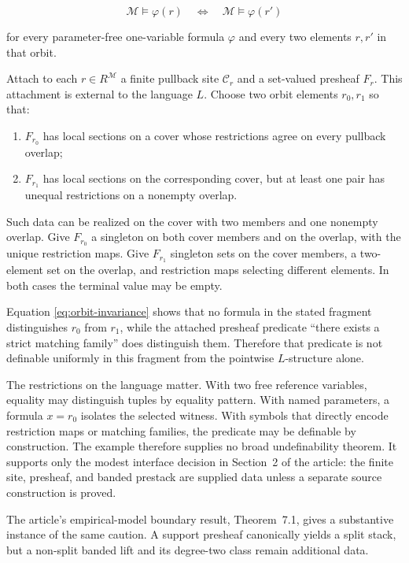 \begin{equation}\label{eq:orbit-invariance}
 \mathcal M\models\varphi(r)
 \quad\Longleftrightarrow\quad
 \mathcal M\models\varphi(r')
\end{equation}

for every parameter-free one-variable formula \(\varphi\) and every two
elements \(r,r'\) in that orbit.

Attach to each \(r\in R^\mathcal M\) a finite pullback site
\(\mathcal C_r\) and a set-valued presheaf \(F_r\).  This attachment is
external to the language \(L\).  Choose two orbit elements \(r_0,r_1\) so
that:

\begin{enumerate}[label=(\roman*),nosep]
\item \(F_{r_0}\) has local sections on a cover whose restrictions agree on
      every pullback overlap;
\item \(F_{r_1}\) has local sections on the corresponding cover, but at least
      one pair has unequal restrictions on a nonempty overlap.
\end{enumerate}

Such data can be realized on the cover with two members and one nonempty
overlap.  Give \(F_{r_0}\) a singleton on both cover members and on the
overlap, with the unique restriction maps.  Give \(F_{r_1}\) singleton
sets on the cover members, a two-element set on the overlap, and restriction
maps selecting different elements.  In both cases the terminal value may be
empty.

Equation \eqref{eq:orbit-invariance} shows that no formula in the stated
fragment distinguishes \(r_0\) from \(r_1\), while the attached presheaf
predicate ``there exists a strict matching family'' does distinguish them.
Therefore that predicate is not definable uniformly in this fragment from
the pointwise \(L\)-structure alone.

The restrictions on the language matter.  With two free reference
variables, equality may distinguish tuples by equality pattern.  With named
parameters, a formula \(x=r_0\) isolates the selected witness.  With symbols
that directly encode restriction maps or matching families, the predicate
may be definable by construction.  The example therefore supplies no broad
undefinability theorem.  It supports only the modest interface decision in
Section~2 of the article: the finite site,
presheaf, and banded prestack
are supplied data unless a separate source construction is proved.

The article's empirical-model boundary result, Theorem~7.1, gives a
substantive instance of the
same caution.  A support presheaf canonically yields a split stack, but a
non-split banded lift and its degree-two class remain additional data.

